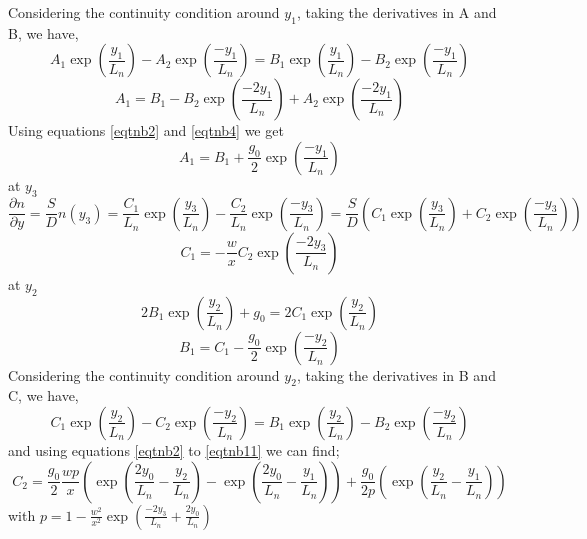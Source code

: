 Considering the continuity condition around $y_1$, taking the derivatives in A and B, we have,
\begin{equation} \label{eqtnb5}
 A_1\exp \left(\frac{y_1}{L_n}\right) - A_2\exp \left(\frac{-y_1}{L_n}\right) =  B_1\exp \left(\frac{y_1}{L_n}\right) - B_2\exp \left(\frac{-y_1}{L_n}\right)
\end{equation}
\begin{equation*} \label{eqtnb6}
 A_1 =  B_1 - B_2\exp \left(\frac{-2y_1}{L_n}\right)  + A_2\exp \left(\frac{-2y_1}{L_n}\right)
\end{equation*}
Using equations \ref{eqtnb2} and \ref{eqtnb4} we get 
\begin{equation}\label{eqtnb7}
A_1 = B_1 + \frac{g_0}{2}\exp \left(\frac{-y_1}{L_n}\right)
\end{equation}
at $y_3$
\begin{equation}\label{eqtnb8}
\frac{\partial n}{\partial y} = \frac{S}{D}n(y_3) = \frac{C_1}{L_n}\exp \left(\frac{y_3}{L_n}\right)  - \frac{C_2}{L_n}\exp \left(\frac{-y_3}{L_n}\right)= \frac{S}{D}\left(C_1\exp \left(\frac{y_3}{L_n}\right) + C_2\exp \left(\frac{-y_3}{L_n}\right)\right)
\end{equation}
\begin{equation}\label{eqtnb9}
C_1 = -\frac{w}{x}C_2\exp \left(\frac{-2y_3}{L_n}\right)
\end{equation}
at $y_2$
\begin{equation*} \label{eqtnb10}
2B_1\exp \left(\frac{y_2}{L_n}\right) + g_0 = 2C_1\exp \left(\frac{y_2}{L_n}\right)
\end{equation*}
\begin{equation} \label{eqtnb11}
B_1 = C_1 - \frac{g_0}{2}\exp \left(\frac{-y_2}{L_n}\right)
\end{equation}
Considering the continuity condition around $y_2$, taking the derivatives in B and C, we have,
\begin{equation} \label{eqtnb12}
 C_1\exp \left(\frac{y_2}{L_n}\right) - C_2\exp \left(\frac{-y_2}{L_n}\right) =  B_1\exp \left(\frac{y_2}{L_n}\right) - B_2\exp \left(\frac{-y_2}{L_n}\right)
\end{equation}
and using equations \ref{eqtnb2} to \ref{eqtnb11} we can find; 
\begin{equation}\label{eqtnb13}
C_2 = \frac{g_0}{2}\frac{wp}{x}\left(\exp \left(\frac{2y_0}{L_n} - \frac{y_2}{L_n}\right)-\exp \left(\frac{2y_0}{L_n} -\frac{y_1}{L_n}\right)\right) + \frac{g_0}{2p}\left(\exp \left(\frac{y_2}{L_n} - \frac{y_1}{L_n}\right)\right)
\end{equation}
with $p = 1 - \frac{w^2}{x^2}\exp \left(\frac{-2y_3}{L_n} +\frac{2y_0}{L_n}\right)$

